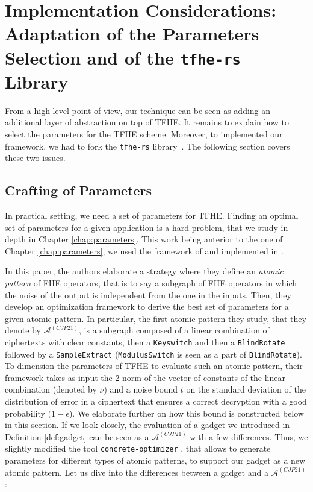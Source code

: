 \section{Implementation Considerations: Adaptation of the Parameters Selection and of the \texttt{tfhe-rs} Library}
\label{sec:p_encodings_TFHE_adaptation}


From a high level point of view, our technique can be seen as adding an additional layer of abstraction on top of TFHE. It remains to explain how to select the parameters for the TFHE scheme. Moreover, to implemented our framework, we had to fork the \texttt{tfhe-rs} library~\cite{tfhe-rs}. The following section covers these two issues.



\subsection{Crafting of Parameters}
\label{sec:parametrization}

In practical setting, we need a set of parameters for TFHE. Finding an optimal set of parameters for a given application is a hard problem, that we study in depth in Chapter \ref{chap:parameters}. This work being anterior to the one of Chapter \ref{chap:parameters}, we used the framework of \cite{AC:CLOT21} and implemented in \cite{concrete-optimizer}.


In this paper, the authors elaborate a strategy where they define an \textit{atomic pattern} of FHE operators, that is to say a subgraph of FHE operators in which the noise of the output is independent from the one in the inputs. Then, they develop an optimization framework to derive the best set of parameters for a given atomic pattern.
%
In particular, the first atomic pattern they study, that they denote by $\mathcal{A}^{(CJP21)}$, is a subgraph composed of a linear combination of ciphertexts with clear constants, then a \texttt{Keyswitch} and then a \texttt{BlindRotate} followed by a \texttt{SampleExtract} (\texttt{ModulusSwitch} is seen as a part of \texttt{BlindRotate}). To dimension the parameters of TFHE to evaluate such an atomic pattern, their framework takes as input the 2-norm of the vector of constants of the linear combination (denoted by $\nu$) and a noise bound $t$ on the standard deviation of the distribution of error in a ciphertext that ensures a correct decryption with a good probability $(1-\epsilon$). We elaborate further on how this bound is constructed below in this section.
%
If we look closely, the evaluation of a gadget we introduced in Definition \ref{def:gadget} can be seen as a $\mathcal{A}^{(CJP21)}$ with a few differences. Thus, we slightly modified the tool \texttt{concrete-optimizer} \cite{concrete-optimizer}, that allows to generate parameters for different types of atomic patterns, to support our gadget as a new atomic pattern. Let us dive into the differences between a gadget and a $\mathcal{A}^{(CJP21)}$:
%
